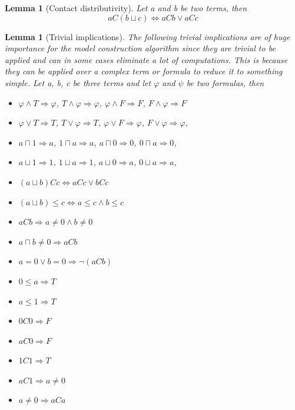 \documentclass{article}
\newtheorem{lemma}[theorem]{Lemma}
\begin{document}
\begin{lemma}[Contact distributivity]
	Let a and b be two terms, then
	\begin{equation*}
		aC(b \sqcup c) \iff aCb \lor aCc
	\end{equation*}
\end{lemma}

\begin{lemma}[Trivial implications] The following trivial implications are of huge importance for the model construction algorithm since they are trivial to be applied and can in some cases eliminate a lot of computations. This is because they can be applied over a complex term or formula to reduce it to something simple.
\newline
	Let a, b, c be three terms and let $\varphi$ and $\psi$ be two formulas, then
	\begin{itemize}
		\item $\varphi \land T \Longrightarrow \varphi$,\;\; $T \land \varphi \Longrightarrow \varphi$,\;\;
		      $\varphi \land F \Longrightarrow F$,\;\; $F \land \varphi \Longrightarrow F$
		\item $\varphi \lor T \Longrightarrow T$,\;\; $T \lor \varphi \Longrightarrow T$,\;\;
		      $\varphi \lor F \Longrightarrow \varphi$,\;\; $F \lor \varphi \Longrightarrow \varphi$,
		\item $a \sqcap 1 \Longrightarrow a$,\;\; $1 \sqcap a \Longrightarrow a$,\;\;
		      $a \sqcap 0 \Longrightarrow 0$,\;\; $0 \sqcap a \Longrightarrow 0$,
		\item $a \sqcup 1 \Longrightarrow 1$,\;\; $1 \sqcup a \Longrightarrow 1$,\;\;
		      $a \sqcup 0 \Longrightarrow a$,\;\; $0 \sqcup a \Longrightarrow a$,
		\item $(a \sqcup b)Cc \iff aCc \lor bCc$
		\item $(a \sqcup b) \leq c \iff a \leq c \land b \leq c$
		\item $aCb \Longrightarrow a \neq 0 \land b \neq 0$
		\item $a \sqcap b \neq 0 \Longrightarrow aCb$
		\item $a = 0 \lor b = 0 \Longrightarrow \neg(aCb)$
		\item $0 \leq a \Longrightarrow T$
		\item $a \leq 1 \Longrightarrow T$
		\item $0C0 \Longrightarrow F$
		\item $aC0 \Longrightarrow F$
		\item $1C1 \Longrightarrow T$
		\item $aC1 \Longrightarrow a \neq 0$
		\item $a \neq 0 \Longrightarrow aCa$
	\end{itemize}
\end{lemma}
\end{document}
